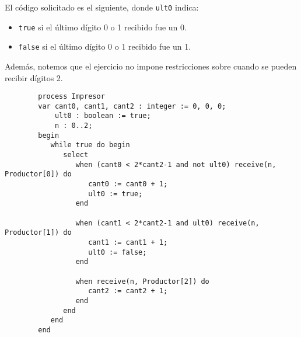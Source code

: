 \begin{ejercicio}
    El código solicitado es el siguiente, donde \verb|ult0| indica:
    \begin{itemize}
        \item \verb|true| si el último dígito 0 o 1 recibido fue un 0.
        \item \verb|false| si el último dígito 0 o 1 recibido fue un 1.
    \end{itemize}
    Además, notemos que el ejercicio no impone restricciones sobre cuando se pueden recibir dígitos 2.
    \begin{verbatim}
        process Impresor
        var cant0, cant1, cant2 : integer := 0, 0, 0;
            ult0 : boolean := true;
            n : 0..2;
        begin
           while true do begin
              select
                 when (cant0 < 2*cant2-1 and not ult0) receive(n, Productor[0]) do
                    cant0 := cant0 + 1;
                    ult0 := true;
                 end

                 when (cant1 < 2*cant2-1 and ult0) receive(n, Productor[1]) do
                    cant1 := cant1 + 1;
                    ult0 := false;
                 end

                 when receive(n, Productor[2]) do
                    cant2 := cant2 + 1;
                 end
              end
           end
        end
    \end{verbatim}
\end{ejercicio}

